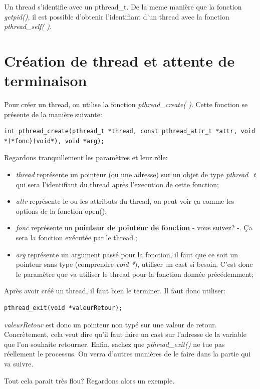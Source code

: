 \documentclass{report}
\begin{document}
Un thread s'identifie avec un pthread\_t. De la meme manière que la fonction \emph{getpid()}, il est possible d'obtenir l'identifiant d'un thread avec la fonction \emph{pthread\_self( )}.
\section{Création de thread et attente de terminaison}
Pour créer un thread, on utilise la fonction \emph{pthread\_create( )}. Cette fonction se présente de la manière suivante:
\begin{verbatim}
int pthread_create(pthread_t *thread, const pthread_attr_t *attr, void *(*fonc)(void*), void *arg);
\end{verbatim}
Regardons tranquillement les paramètres et leur rôle:
\begin{itemize}
\item{\emph{thread} représente un pointeur (ou une adresse) sur un objet de type \emph{pthread\_t} qui sera l'identifiant du thread après l'execution de cette fonction;}
\item{\emph{attr} représente le ou les attributs du thread, on peut voir ça comme les options de la fonction open();}
\item{\emph{fonc} représente un \textbf{pointeur de pointeur de fonction} - vous suivez? -. Ça sera la fonction exécutée par le thread.;}
\item{\emph{arg} représente un argument passé pour la fonction, il faut que ce soit un pointeur sans type (comprendre \emph{void *}), utiliser un cast si besoin. C'est donc le paramètre que va utiliser le thread pour la fonction donnée précédemment;}
\end{itemize}

Après avoir créé un thread, il faut bien le terminer. Il faut donc utiliser:
\begin{verbatim}
pthread_exit(void *valeurRetour);
\end{verbatim}
\emph{valeurRetour} est donc un pointeur non typé sur une valeur de retour. Concrètement, cela veut dire qu'il faut faire un cast sur l'adresse de la variable que l'on souhaite retourner.
Enfin, sachez que \emph{pthread\_exit()} ne tue pas réellement le processus. On verra d'autres manières de le faire dans la partie qui va suivre.

Tout cela parait très flou? Regardons alors un exemple.
\end{document}
